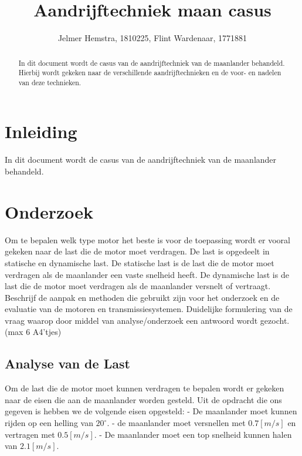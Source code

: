 \documentclass{article}
\title{Aandrijftechniek maan casus}
\author{Jelmer Hemstra, 1810225, Flint Wardenaar, 1771881}
\begin{document}
\maketitle

\begin{abstract}
    In dit document wordt de casus van de aandrijftechniek van de maanlander behandeld. Hierbij wordt gekeken naar de verschillende aandrijftechnieken en de voor- en nadelen van deze technieken.
\end{abstract}



\section{Inleiding}
    In dit document wordt de casus van de aandrijftechniek van de maanlander behandeld. 


\section{Onderzoek}


    Om te bepalen welk type motor het beste is voor de toepassing wordt er vooral gekeken naar de last die de motor moet verdragen.
    De last is opgedeelt in statische en dynamische last. 
    De statische last is de last die de motor moet verdragen als de maanlander een vaste snelheid heeft.
    De dynamische last is de last die de motor moet verdragen als de maanlander versnelt of vertraagt.
    \newline
    Beschrijf de aanpak en methoden die gebruikt zijn voor het onderzoek en de evaluatie van de motoren en transmissiesystemen.
    Duidelijke formulering van de vraag waarop
    door middel van analyse/onderzoek een
    antwoord wordt gezocht. (max 6 A4’tjes)




\subsection{Analyse van de Last}
    Om de last die de motor moet kunnen verdragen te bepalen wordt er gekeken naar de eisen die aan de maanlander worden gesteld.
    Uit de opdracht die ons gegeven is hebben we de volgende eisen opgesteld:\newline
    - De maanlander moet kunnen rijden op een helling van $20^{\circ}$. \newline
    - de maanlander moet versnellen met $0.7[m/s]$ en vertragen met $0.5[m/s]$. \newline
    - De maanlander moet een top snelheid kunnen halen van $2.1[m/s]$. \newline
\end{document}
